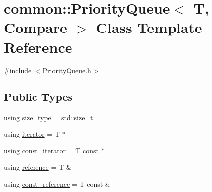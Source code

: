 \hypertarget{classcommon_1_1PriorityQueue}{}\section{common\+:\+:Priority\+Queue$<$ T, Compare $>$ Class Template Reference}
\label{classcommon_1_1PriorityQueue}


{\ttfamily \#include $<$Priority\+Queue.\+h$>$}

\subsection*{Public Types}
\begin{DoxyCompactItemize}
\item 
using \hyperlink{classcommon_1_1PriorityQueue_ab57641d3a949b913edba887241ca6e7d}{size\+\_\+type} = std\+::size\+\_\+t
\item 
using \hyperlink{classcommon_1_1PriorityQueue_ab537c372fee0c15e7d6319fac2fc8a62}{iterator} = T $\ast$
\item 
using \hyperlink{classcommon_1_1PriorityQueue_ad22a4ff01afbdd1ab13ebffa8c61c924}{const\+\_\+iterator} = T const $\ast$
\item 
using \hyperlink{classcommon_1_1PriorityQueue_ab373612fd8bc3716f22936d6b6454b86}{reference} = T \&
\item 
using \hyperlink{classcommon_1_1PriorityQueue_ae9270b1553c1337f99508699590ee7c0}{const\+\_\+reference} = T const \&
\end{DoxyCompactItemize}
